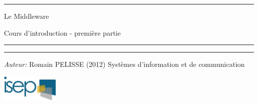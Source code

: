 \begin{titlepage}


\begin{center}
\vspace{20pt}
\hrule
\vspace{12pt}

\begin{center}
{ \huge Le Middleware}
\end{center}

\vspace{10pt}

\begin{center}
{ \Large Cours d'introduction - première partie}
\end{center}
\vspace{3pt}
\hrule
\vspace{12pt}
\begin{center}


\end{center}
\vfill
\hrule
\vspace{10pt}

\begin{minipage}{0.7\textwidth}
\begin{flushleft} \large
\emph{Auteur:} Romain PELISSE (2012)
\newline
Systèmes d'information et de communication
\end{flushleft}
\end{minipage}
\begin{minipage}{0.2\textwidth}
\begin{flushright} \large
  \includegraphics[height=50px]{../img/isep-logo.png}
\end{flushright}
\end{minipage}
\end{center}
\end{titlepage}
